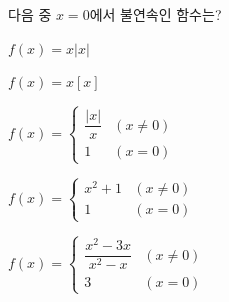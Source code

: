 다음 중 $x=0$에서 불연속인 함수는? 
\begin{choicesii}{\rule[-3ex]{0pt}{8ex}$f(x)=x|x|$}{\rule[-3ex]{0pt}{8ex}$f(x)=x[x]$}{\rule[-3ex]{0pt}{8ex}$f(x)=\begin{cases} \dfrac{|x|}{x} & (x\ne 0) \\ 1 & (x=0) \end{cases}$}{\rule[-3ex]{0pt}{8ex}$f(x)=\begin{cases} x^2+1 & (x\ne 0) \\ 1 & (x=0) \end{cases}$}{\rule[-3ex]{0pt}{8ex}$f(x)=\begin{cases} \dfrac{x^2-3x}{x^2-x} & (x\ne 0) \\ 3 & (x=0) \end{cases}$}\end{choicesii}
